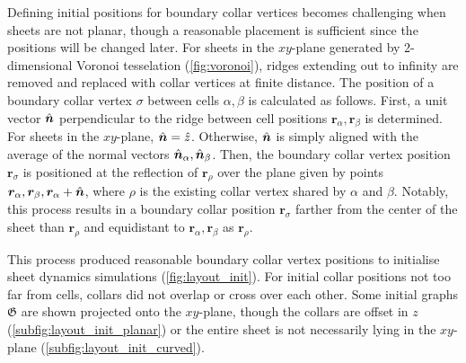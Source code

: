 Defining initial positions for boundary collar vertices becomes challenging when sheets are not planar, though a reasonable placement is sufficient since the positions will be changed later. For sheets in the $xy$-plane generated by 2-dimensional Voronoi tesselation (\cref{fig:voronoi}), ridges extending out to infinity are removed and replaced with collar vertices at finite distance. The position of a boundary collar vertex $\sigma$ between cells $\alpha, \beta$ is calculated as follows. 
First, a unit vector $\hat{\bm{n}}$ perpendicular to the ridge between cell positions $\bm{r}_\alpha, \bm{r}_\beta$ is determined. 
For sheets in the $xy$-plane, $\hat{\bm{n}}=\hat{z}$. Otherwise, $\hat{\bm{n}}$ is simply aligned with the average of the normal vectors $\hat{\bm{n}}_\alpha, \hat{\bm{n}}_\beta$.
Then, the boundary collar vertex position $\bm{r}_\sigma$ is positioned at the reflection of $\bm{r}_\rho$ over the plane given by points $\bm{r}_\alpha, \bm{r}_\beta, \bm{r}_\alpha + \hat{\bm{n}}$, where $\rho$ is the existing collar vertex shared by $\alpha$ and $\beta$.
Notably, this process results in a boundary collar position $\bm{r}_\sigma$ farther from the center of the sheet than $\bm{r}_\rho$ and equidistant to $\bm{r}_\alpha, \bm{r}_\beta$ as $\bm{r}_\rho$. 

This process produced reasonable boundary collar vertex positions to initialise sheet dynamics simulations (\cref{fig:layout_init}). For initial collar positions not too far from cells, collars did not overlap or cross over each other. Some initial graphs $\mathfrak{G}$ are shown projected onto the $xy$-plane, though the collars are offset in $z$ (\cref{subfig:layout_init_planar}) or the entire sheet is not necessarily lying in the $xy$-plane (\cref{subfig:layout_init_curved}).


